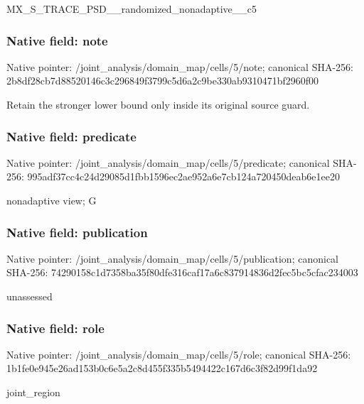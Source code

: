 \documentclass[10pt,a4paper]{article}
\begin{document}
\begingroup\raggedright\sloppy MX\_\allowbreak{}S\_\allowbreak{}TRACE\_\allowbreak{}PSD\_\allowbreak{}\_\allowbreak{}randomized\_\allowbreak{}nonadaptive\_\allowbreak{}\_\allowbreak{}c5\par\endgroup

\subsubsection{Native field: note}
Native pointer: /joint\_\allowbreak{}analysis/domain\_\allowbreak{}map/cells/5/note; canonical SHA-256: 2b8df28cb7d88520146c3c296849f3799c5d6a2c9be330ab9310471bf2960f00

\begingroup\raggedright\sloppy Retain the stronger lower bound only inside its original source guard.\par\endgroup

\subsubsection{Native field: predicate}
Native pointer: /joint\_\allowbreak{}analysis/domain\_\allowbreak{}map/cells/5/predicate; canonical SHA-256: 995adf37cc4c24d29085d1fbb1596ec2ae952a6e7cb124a720450deab6e1ee20

\begingroup\raggedright\sloppy nonadaptive view;\allowbreak{} G\par\endgroup

\subsubsection{Native field: publication}
Native pointer: /joint\_\allowbreak{}analysis/domain\_\allowbreak{}map/cells/5/publication; canonical SHA-256: 74290158c1d7358ba35f80dfe316caf17a6c837914836d2fec5bc5cfac234003

\begingroup\raggedright\sloppy unassessed\par\endgroup

\subsubsection{Native field: role}
Native pointer: /joint\_\allowbreak{}analysis/domain\_\allowbreak{}map/cells/5/role; canonical SHA-256: 1b1fe0e945e26ad153b0c6e5a2c8d455f335b5494422c167d6c3f82d99f1da92

\begingroup\raggedright\sloppy joint\_\allowbreak{}region\par\endgroup
\end{document}
